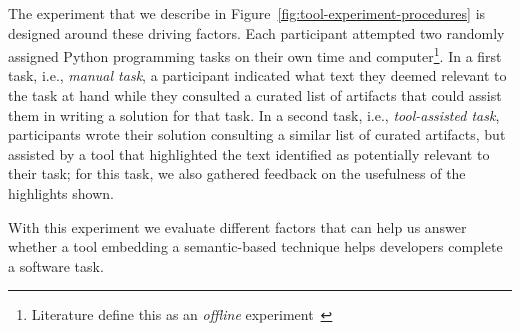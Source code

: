 

 










The experiment that we describe in Figure~\ref{fig:tool-experiment-procedures} is designed around these driving factors.  
Each participant attempted two randomly assigned Python programming tasks on their own time and computer\footnote{Literature define this as an \textit{offline} experiment~\cite{wohlin2012, DeLucia2012}}.
In a first task, i.e., \textit{manual task}, a participant indicated 
what text they deemed relevant to the task at hand while 
they consulted a curated list of artifacts that could assist them in writing a solution for that task.
In a second task, i.e., \textit{tool-assisted task},
participants wrote their solution consulting a similar list of curated artifacts, but
assisted by a tool that highlighted the text identified as potentially relevant to their task; for this task, we also gathered feedback on the usefulness of the highlights shown.

 

With this experiment we evaluate different factors that can help us answer whether 
a tool embedding a semantic-based technique helps developers complete a software task. 
